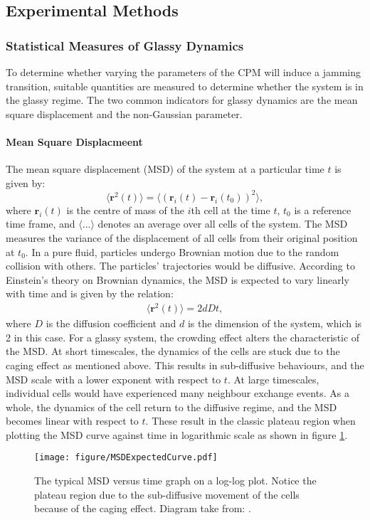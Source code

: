 \documentclass[a4paper,12pt]{article}
\begin{document}
\subsection{Experimental Methods}
\subsubsection{Statistical Measures of Glassy Dynamics}
To determine whether varying the parameters of the CPM will induce a jamming transition, suitable quantities are measured to determine whether the system is in the glassy regime. The two common indicators for glassy dynamics are the mean square displacement and the non-Gaussian parameter.

\paragraph{Mean Square Displacmeent}
The mean square displacement (MSD) of the system at a particular time $t$ is given by:
\begin{equation}
\langle{\bm{r}^2(t)\rangle} = \langle{\left(\bm{r}_i(t) - \bm{r}_i(t_0)\right)^2\rangle},
\end{equation}
where $\bm{r}_i (t)$ is the centre of mass of the $i$th cell at the time $t$, $t_0$ is a reference time frame, and $\langle...\rangle$ denotes an average over all cells of the system. The MSD measures the variance of the displacement of all cells from their original position at $t_0$. In a pure fluid, particles undergo Brownian motion due to the random collision with others. The particles' trajectories would be diffusive. According to Einstein's theory on Brownian dynamics, the MSD is expected to vary linearly with time and is given by the relation:
\begin{eqnarray}
\langle{\bm{r}^2(t)\rangle} = 2dDt, 
\end{eqnarray}
where $D$ is the diffusion coefficient and $d$ is the dimension of the system, which is 2 in this case. For a glassy system, the crowding effect alters the characteristic of the MSD. At short timescales, the dynamics of the cells are stuck due to the caging effect as mentioned above. This results in sub-diffusive behaviours, and the MSD scale with a lower exponent with respect to $t$. At large timescales, individual cells would have experienced many neighbour exchange events. As a whole, the dynamics of the cell return to the diffusive regime, and the MSD becomes linear with respect to $t$. These result in the classic plateau region when plotting the MSD curve against time in logarithmic scale as shown in figure \ref{fig:MSDExpectedCurve}. 
\begin{figure}[h]
\centering
\texttt{[image: figure/MSDExpectedCurve.pdf]}
\caption{The typical MSD versus time graph on a log-log plot. Notice the plateau region due to the sub-diffusive movement of the cells because of the caging effect. Diagram take from: \cite{hofling2013}.}
\label{fig:MSDExpectedCurve}
\end{figure}
\end{document}
